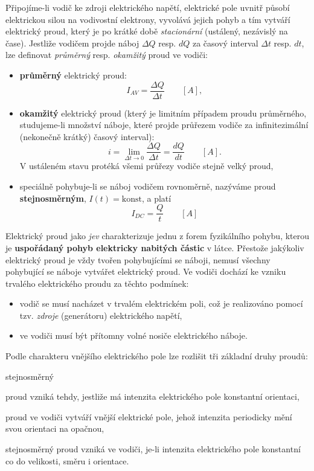         Připojíme-li vodič ke zdroji elektrického napětí, elektrické pole uvnitř působí elektrickou
        silou na vodivostní elektrony, vyvolává jejich pohyb a tím vytváří elektrický proud, který
        je po krátké době \emph{stacionární} (ustálený, nezávislý na čase). Jestliže vodičem projde
        náboj $\Delta Q$ resp. $dQ$ za časový interval $\Delta t$ resp. $dt$, lze definovat
        \emph{průměrný} resp. \emph{okamžitý} proud ve vodiči:
        \begin{itemize}
          \item \textbf{průměrný} elektrický proud: $$I_{AV} = \frac{\Delta Q}{\Delta t}
                \qquad[A],$$
          \item \textbf{okamžitý} elektrický proud (který je limitním případem proudu průměrného,
                studujeme-li množství náboje, které projde průřezem vodiče za infinitezimální
                (nekonečně krátký) časový interval): $$i = \lim_{\Delta t \rightarrow 0}\frac{\Delta
                Q}{\Delta t} = \frac{dQ}{dt} \qquad[A].$$ V ustáleném stavu protéká všemi průřezy
                vodiče stejně velký proud,
          \item speciálně pohybuje-li se náboj vodičem rovnoměrně, nazýváme proud
                \textbf{stejno\-směr\-ným}, $I(t) = \text{konst}$, a platí $$ I_{DC} =
                \frac{Q}{t}\qquad[A] $$
        \end{itemize}        

        Elektrický proud jako \emph{jev} charakterizuje jednu z forem fyzikálního pohybu, kterou je
        \textbf{uspořádaný pohyb elektricky nabitých částic} v látce. Přestože jakýkoliv elektrický
        proud je vždy tvořen pohybujícími se náboji, nemusí všechny pohybující se náboje vytvářet
        elektrický proud. Ve vodiči dochází ke vzniku trvalého elektrického proudu za těchto
        podmínek:
          \begin{itemize}
            \item vodič se musí nacházet v trvalém elektrickém poli, což je realizováno pomocí tzv.
                  \emph{zdroje} (generátoru) elektrického napětí,
            \item ve vodiči musí být přítomny volné nosiče elektrického náboje.
          \end{itemize}
        
        Podle charakteru vnějšího elektrického pole lze rozlišit tři základní druhy proudů:
          \begin{labeling}{stejnosměrný}
            \item[\textbf{stejnosměrný}] proud vzniká tehdy, jestliže má intenzita elektrického pole
                   konstantní orientaci,
            \item[\textbf{střídavý}] proud ve vodiči vytváří vnější elektrické pole, jehož intenzita
                  periodicky mění svou orientaci na opačnou,
            \item[\textbf{stacionární}] stejnosměrný proud vzniká ve vodiči, je-li intenzita
                  elektrického pole konstantní co do velikosti, směru i orientace.
          \end{labeling}  

